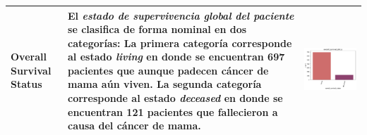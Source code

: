 \begin{table}[!htb]
\begin{threeparttable}
\begin{tabular}{p{2.5cm} p{7cm} p{6.5cm}}
			Overall Survival Status
			& El \textit{estado de supervivencia global del paciente} se clasifica de forma nominal en dos categorías: La primera categoría corresponde al estado \textit{living} en donde se encuentran 697 pacientes que aunque padecen cáncer de mama aún viven. La segunda categoría corresponde al estado \textit{deceased} en donde se encuentran 121 pacientes que fallecieron a causa del cáncer de mama. 
			& \begin{center}\includegraphics[width=1\linewidth]{NOTEBOOK/IMAGENES_DESCRIPTIVAS/33_overall_survival_status}\end{center}
			\\ \hline
			
		\end{tabular}
	\end{threeparttable}
\end{table}

